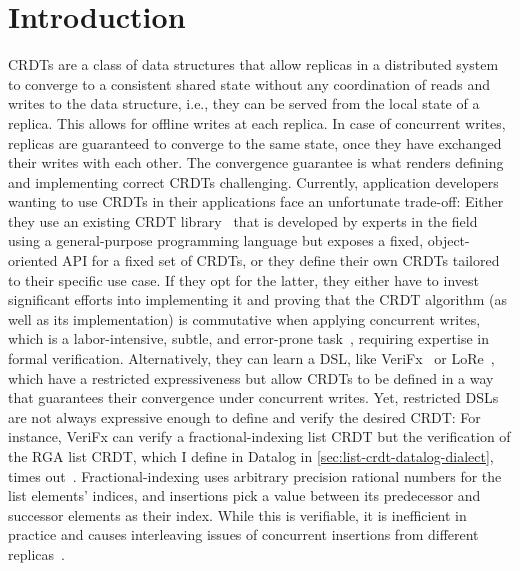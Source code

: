 
\chapter{Introduction}\label{ch:intro}

\acp{CRDT} are a class of data structures that allow replicas in a distributed
system to converge to a consistent shared state without any coordination
of reads and writes to the data structure, i.e., they can be served from the
local state of a replica.
This allows for offline writes at each replica.
In case of concurrent writes, replicas are guaranteed to converge to the same state,
once they have exchanged their writes with each other.
The convergence guarantee is what renders defining and implementing
correct \acp{CRDT} challenging.
Currently, application developers wanting to use \acp{CRDT} in their applications
face an unfortunate trade-off:
Either they use an existing \ac{CRDT} library~\cite{automerge,yjs,lore}
that is developed by experts in the field using a general-purpose programming language
but exposes a fixed, object-oriented \acs{API} for a fixed set of \acp{CRDT},
or they define their own \acp{CRDT} tailored to their specific use case.
If they opt for the latter, they either have to invest significant efforts
into implementing it and proving that the \ac{CRDT} algorithm
(as well as its implementation) is commutative when applying concurrent writes,
which is a labor-intensive, subtle, and error-prone
task~\cite{gomes2017verifying,kleppmann2022assessing},
requiring expertise in formal verification.
Alternatively, they can learn a \ac{DSL}, like VeriFx~\cite{verifx}
or LoRe~\cite{lore}, which have a restricted expressiveness but allow
\acp{CRDT} to be defined in a way that guarantees their convergence under
concurrent writes.
Yet, restricted \acp{DSL} are not always expressive enough
to define and verify the desired \ac{CRDT}:
For instance, VeriFx can verify a fractional-indexing list \ac{CRDT}
but the verification of the \acs{RGA} list \ac{CRDT}, which I define in Datalog in
\ref{sec:list-crdt-datalog-dialect}, times out~\cite{verifx}.
Fractional-indexing uses arbitrary precision rational numbers for the list
elements' indices, and insertions pick a value between its predecessor and
successor elements as their index.
While this is verifiable, it is inefficient in practice and causes
interleaving issues of concurrent insertions from different replicas~\cite{fugue}.

